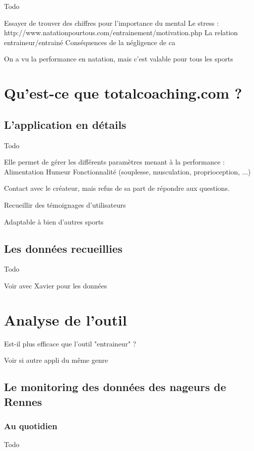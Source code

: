 Todo

Essayer de trouver des chiffres pour l'importance du mental
Le stress : http://www.natationpourtous.com/entrainement/motivation.php
La relation entraineur/entrainé
Conséquences de la négligence de ca

On a vu la performance en natation, mais c'est valable pour tous les sports

\clearpage
\section{Qu’est-ce que totalcoaching.com ?}
\subsection{L’application en détails}

Todo


Elle permet de gérer les différents paramètres menant à la performance :
Alimentation
Humeur
Fonctionnalité (souplesse, musculation, proprioception, ...)

Contact avec le créateur, mais refus de sa part de répondre aux questions.

Recueillir des témoignages d'utilisateurs

Adaptable à bien d'autres sports


\subsection{Les données recueillies}

Todo

Voir avec Xavier pour les données


\clearpage
\section{Analyse de l’outil}

Est-il plus efficace que l’outil "entraineur" ?

Voir si autre appli du même genre

\subsection{Le monitoring des données des nageurs de Rennes}
\subsubsection{Au quotidien}

Todo



